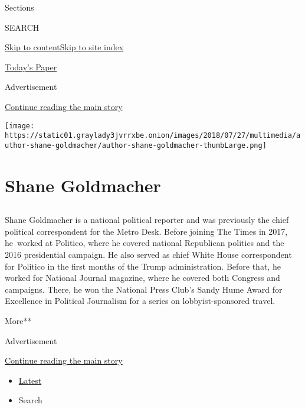Sections

SEARCH

\protect\hyperlink{site-content}{Skip to
content}\protect\hyperlink{site-index}{Skip to site index}

\href{https://myaccount.nytimes3xbfgragh.onion/auth/login?response_type=cookie\&client_id=vi}{}

\href{https://www.nytimes3xbfgragh.onion/section/todayspaper}{Today's
Paper}

Advertisement

\protect\hyperlink{after-top}{Continue reading the main story}

\texttt{[image: https://static01.graylady3jvrrxbe.onion/images/2018/07/27/multimedia/author-shane-goldmacher/author-shane-goldmacher-thumbLarge.png]}

\hypertarget{shane-goldmacher}{%
\section{Shane Goldmacher}\label{shane-goldmacher}}

\subsection{}

Shane Goldmacher is a national political reporter and was previously the
chief political correspondent for the Metro Desk. Before joining The
Times in 2017, he~worked at Politico, where he covered national
Republican politics and the 2016 presidential campaign. He also served
as chief White House correspondent for Politico in the first months of
the Trump administration. Before that, he worked for National Journal
magazine, where he covered both Congress and campaigns. There, he won
the National Press Club's Sandy Hume Award for Excellence in Political
Journalism for a series on lobbyist-sponsored travel.

More**

Advertisement

\protect\hyperlink{after-mid1}{Continue reading the main story}

\begin{itemize}
\tightlist
\item
  \protect\hyperlink{stream-panel}{Latest}
\item
  Search
\end{itemize}


